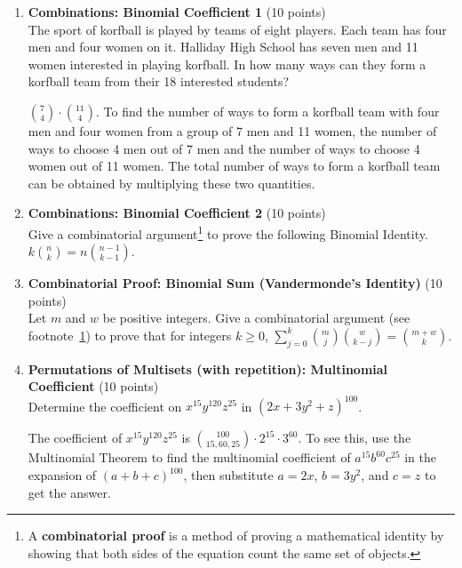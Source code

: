\begin{enumerate}
  \newpage

  

  \item \textbf{Combinations: Binomial Coefficient 1} (10 points)\\
  The sport of korfball is played by teams of eight players. Each team has four men and four women on it. Halliday High School has seven men and 11 women interested in playing korfball. In how many ways can they form a korfball team from their 18 interested students?
  \begin{subanswer}
    $\binom{7}{4} \cdot \binom{11}{4}$. To find the number of ways to form a korfball team with four men and four women from a group of 7 men and 11 women, the number of ways to choose 4 men out of 7 men and the number of ways to choose 4 women out of 11 women. The total number of ways to form a korfball team can be obtained by multiplying these two quantities.
  \end{subanswer}

  \item \textbf{Combinations: Binomial Coefficient 2} (10 points)\\
  Give a combinatorial argument\footnote{\label{fn:combinatorial}A \textbf{combinatorial proof} is a 
  method of proving a mathematical identity by showing that both sides of 
  the equation count the same set of objects.} to prove the following Binomial 
  Identity.
  $k \binom{n}{k} = n \binom{n-1}{k-1}$.
  \begin{subprove}
  \end{subprove}

  \item \textbf{Combinatorial Proof: Binomial Sum (Vandermonde's Identity)} (10 points)\\
  Let $m$ and $w$ be positive integers. Give a combinatorial argument (see footnote~\ref{fn:combinatorial}) to prove 
  that for integers $k \geq 0$,
  $\sum_{j=0}^{k} \binom{m}{j} \binom{w}{k-j} = \binom{m+w}{k}$.
  \begin{subprove}
  \end{subprove}

  \item \textbf{Permutations of Multisets (with repetition): Multinomial Coefficient} (10 points)\\
  Determine the coefficient on $x^{15} y^{120} z^{25}$ in $(2x+3y^2+z)^{100}$.
  \begin{subanswer}
    The coefficient of $x^{15} y^{120} z^{25}$ is $\binom{100}{15,60,25} \cdot 2^{15} \cdot 3^{60}$. To see this, use the Multinomial Theorem to find the multinomial coefficient of $a^{15} b^{60} c^{25}$ in the expansion of $(a+b+c)^{100}$, then substitute $a=2x$, $b=3y^2$, and $c=z$ to get the answer.
  \end{subanswer}


\end{enumerate}
